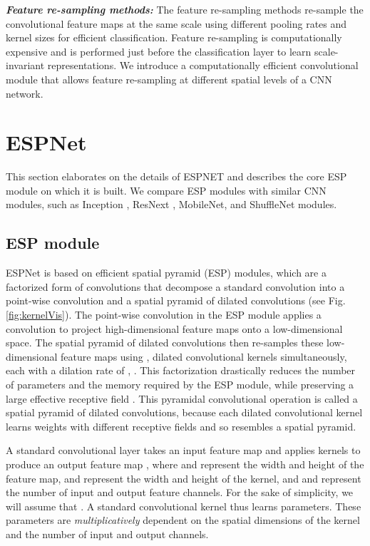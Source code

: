 \documentclass[runningheads]{llncs}
\def\Fig{Fig. }
\begin{document}
\noindent \textbf{\textit{Feature re-sampling methods:}} The feature re-sampling methods re-sample the convolutional feature maps at the same scale using different pooling rates \cite{zhao2017pyramid,he2014spatial} and kernel sizes \cite{chen2016deeplab} for efficient classification. Feature re-sampling is computationally expensive and is performed just before  the classification layer to learn scale-invariant representations. We introduce a computationally efficient convolutional module that allows feature re-sampling at different spatial levels of a CNN network.

\section{ESPNet}
\label{sec:espnetArc}
This section  elaborates on the details of ESPNET and describes the core ESP module on which it is built. We compare ESP modules with similar CNN modules, such as Inception \cite{szegedy2015going,szegedy2016rethinking,SzegedyIV16InceptionV4}, ResNext \cite{xie2017aggregated}, MobileNet\cite{howard2017mobilenets}, and ShuffleNet\cite{zhang2017shufflenet} modules. 

\subsection{ESP module}
ESPNet is based on efficient spatial pyramid (ESP) modules, which are a factorized form of convolutions that decompose a standard convolution into a point-wise convolution and a spatial pyramid of dilated convolutions (see \Fig \ref{fig:kernelVis}). The point-wise convolution in the ESP module applies a  convolution to project high-dimensional feature maps onto a low-dimensional space. The spatial pyramid of dilated convolutions then re-samples these low-dimensional feature maps using ,  dilated convolutional kernels simultaneously, each with a dilation rate of , . This factorization drastically reduces the number of parameters and the memory required by the ESP module, while preserving a large effective receptive field . This pyramidal convolutional operation is called a spatial pyramid of dilated convolutions, because each dilated convolutional kernel learns weights with different receptive fields and so resembles a spatial pyramid.  

A standard convolutional layer takes an input feature map  and applies  kernels  to produce an output feature map , where  and  represent the width and height of the feature map,  and  represent the width and height of the kernel, and  and  represent the number of input and output feature channels. For the sake of simplicity, we will assume that . A standard convolutional kernel thus learns  parameters. These parameters are \textit{multiplicatively} dependent on the spatial dimensions of the  kernel and the number of input  and output  channels. 
\end{document}
